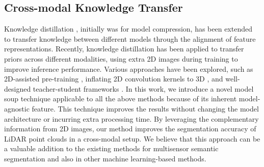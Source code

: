 \documentclass[10pt,twocolumn,letterpaper]{article}
\begin{document}
\subsection{Cross-modal Knowledge Transfer}
Knowledge distillation \cite{hinton2015distilling}, initially was for model compression, has been extended to transfer knowledge between different models through the alignment of feature representations.\cite{ba2013deep,chen2017learning,zagoruyko2016paying,srinivas2018knowledge,gupta2016cross,wang2019efficient,yuan2018rgb,liu20213d,zhao2020knowledge}
Recently, knowledge distillation has been applied to transfer priors across different modalities, using extra 2D images during training to improve inference performance. 
Various approaches have been explored, such as 2D-assisted pre-training  \cite{liu2021learning}, 
inflating 2D convolution kernels to 3D \cite{xu2021image2point}, 
and well-designed teacher-student frameworks \cite{yuan2022x}.
In this work, we introduce a novel model soup \cite{wortsman2022model,dansereau2023model} technique applicable to all the above methods because of its inherent model-agnostic feature. 
This technique improves the results without changing the model architecture or incurring extra processing time. By leveraging the complementary information from 2D images, our method improves the segmentation accuracy of LiDAR point clouds in a cross-modal setup. We believe that this approach can be a valuable addition to the existing methods for multisensor semantic segmentation and also in other machine learning-based methods.
\end{document}

